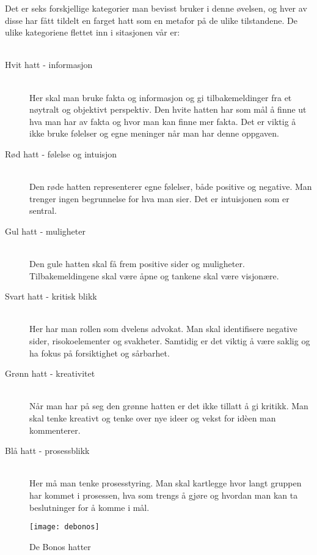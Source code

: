 Det er seks forskjellige kategorier man bevisst bruker i denne øvelsen, og hver av disse har fått tildelt en farget hatt som en metafor på de ulike tilstandene. De ulike kategoriene flettet inn i sitasjonen vår er:
\\
\\
\begin{description}
\item[Hvit hatt - informasjon] \hfill \\
Her skal man bruke fakta og informasjon og gi tilbakemeldinger fra et nøytralt og objektivt perspektiv. Den hvite hatten har som mål å finne ut hva man har av fakta og hvor man kan finne mer fakta. Det er viktig å ikke bruke følelser og egne meninger når man har denne oppgaven.

\item[Rød hatt - følelse og intuisjon]\hfill \\
Den røde hatten representerer egne følelser, både positive og negative. Man trenger ingen begrunnelse for hva man sier. Det er intuisjonen som er sentral.

\item[Gul hatt - muligheter] \hfill \\
Den gule hatten skal få frem positive sider og muligheter. Tilbakemeldingene skal være åpne og tankene skal være visjonære.

\item[Svart hatt - kritisk blikk] \hfill \\
Her har man rollen som dvelens advokat. Man skal identifisere negative sider, risokoelementer og svakheter. Samtidig er det viktig å være saklig og ha fokus på forsiktighet og sårbarhet.

\item[Grønn hatt - kreativitet] \hfill \\
Når man har på seg den grønne hatten er det ikke tillatt å gi kritikk. Man skal tenke kreativt og tenke over nye ideer og vekst for idèen man kommenterer.

\item[Blå hatt - prosessblikk] \hfill \\
Her må man tenke prosesstyring. Man skal kartlegge hvor langt gruppen har kommet i prosessen, hva som trengs å gjøre og hvordan man kan ta beslutninger for å komme i mål. \\


\end{description}

		\begin{figure} [here]
				\begin{center}
					\texttt{[image: debonos]}
				\end{center}
			\caption{De Bonos hatter}
		\end{figure}
		
